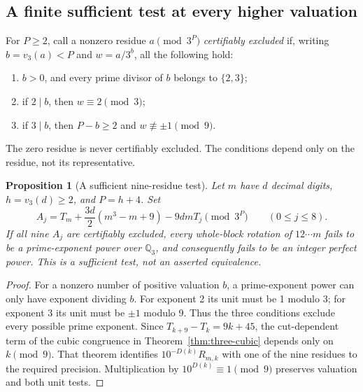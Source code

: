 \documentclass[10pt]{article}
\newtheorem{proposition}{Proposition}
\begin{document}
\subsection*{A finite sufficient test at every higher valuation}
For $P\ge2$, call a nonzero residue $a\pmod{3^P}$
\emph{certifiably excluded} if, writing $b=v_3(a)<P$ and
$w=a/3^b$, all the following hold:
\begin{enumerate}
\item $b>0$, and every prime divisor of $b$ belongs to $\{2,3\}$;
\item if $2\mid b$, then $w\equiv2\pmod3$;
\item if $3\mid b$, then $P-b\ge2$ and $w\not\equiv\pm1\pmod9$.
\end{enumerate}
The zero residue is never certifiably excluded. The conditions depend
only on the residue, not its representative.

\begin{proposition}[A sufficient nine-residue test]\label{prop:higher-sufficient}
Let $m$ have $d$ decimal digits, $h=v_3(d)\ge2$, and $P=h+4$.
Set
\[
 A_j=T_m+\frac{3d}{2}(m^3-m+9)-9dmT_j\pmod{3^P}
 \qquad(0\le j\le8).
\]
If all nine $A_j$ are certifiably excluded, every whole-block rotation
of $12\cdots m$ fails to be a prime-exponent power over $\mathbb Q_3$,
and consequently fails to be an integer perfect power.
This is a sufficient test, not an asserted equivalence.
\end{proposition}
\begin{proof}
For a nonzero number of positive valuation $b$, a prime-exponent power
can only have exponent dividing $b$. For exponent 2 its unit must be 1
modulo 3; for exponent 3 its unit must be $\pm1$ modulo 9.
Thus the three conditions exclude every possible prime exponent.
Since $T_{k+9}-T_k=9k+45$, the cut-dependent term of the cubic
congruence in Theorem~\ref{thm:three-cubic} depends only on $k\pmod9$.
That theorem identifies $10^{-D(k)}R_{m,k}$ with one of the nine
residues to the required precision. Multiplication by
$10^{D(k)}\equiv1\pmod9$ preserves valuation and both unit tests.
\end{proof}
\end{document}
